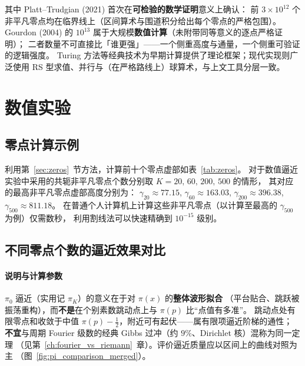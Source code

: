 其中 Platt--Trudgian (2021) 首次在\textbf{可检验的数学证明}意义上确认：
前 $3\times 10^{12}$ 个非平凡零点均在临界线上（区间算术与围道积分给出每个零点的严格包围）。
Gourdon (2004) 的 $10^{13}$ 属于大规模\textbf{数值计算}（未附带同等意义的逐点严格证明）；
二者数量不可直接比「谁更强」——一个侧重高度与通量，一个侧重可验证的逻辑强度。
Turing 方法等经典技术为早期计算提供了理论框架；现代实现则广泛使用
RS 型求值、并行与（在严格路线上）球算术，与上文工具分层一致。

\section{数值实验}\label{sec:numerical}

\subsection{零点计算示例}

利用第~\ref{sec:zeros}~节方法，计算前十个零点虚部如表~\ref{tab:zeros}。
对于数值逼近实验中采用的共轭非平凡零点个数分别取 $K = 20,\, 60,\, 200,\, 500$ 的情形，
其对应的最高非平凡零点虚部高度分别为：
$\gamma_{20} \approx 77.15$,
$\gamma_{60} \approx 163.03$,
$\gamma_{200} \approx 396.38$,
$\gamma_{500} \approx 811.18$。
在普通个人计算机上计算这些非平凡零点（以计算至最高的 $\gamma_{500}$ 为例）仅需数秒，
利用割线法可以快速精确到 $10^{-15}$ 级别。

\subsection{不同零点个数的逼近效果对比}\label{subsec:comparison_plots}


\vspace{0.1cm}

\paragraph{说明与计算参数}
$\pi_0$ 逼近（实用记 $\pi_K$）的意义在于对 $\pi(x)$ 的\textbf{整体波形拟合}
（平台贴合、跳跃被振荡重构），而\textbf{不是}在个别素数跳动点上与 $\pi(p)$ 比“点值有多准”。
跳动点处有限零点和收敛于中值 $\pi(p)-\frac12$，附近可有起伏——属有限项逼近阶梯的通性；
\textbf{不宜}与周期 Fourier 级数的经典 Gibbs 过冲（约 $9\%$、Dirichlet 核）混称为同一定理
（见第~\ref{ch:fourier_vs_riemann}~章）。评价逼近质量应以区间上的曲线对照为主
（图~\ref{fig:pi_comparison_merged}）。

